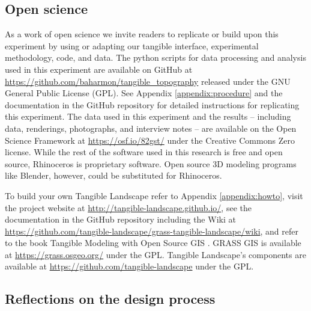 \documentclass[prodmode,acmtochi]{acmsmall} %
\begin{document}
\subsection{Open science} 

% 
%

As a work of open science we invite readers to
replicate or build upon this experiment by 
using or adapting our tangible interface, experimental methodology, code, and data. 
The python scripts for data processing and analysis used in this experiment 
are available on GitHub at 
\url{https://github.com/baharmon/tangible_topography}
released under the GNU General Public License (GPL). 
See Appendix \ref{appendix:procedure}
and the documentation in the GitHub repository 
for detailed instructions for replicating this experiment. 
The data used in this experiment 
and the results -- 
including data, renderings, photographs, and interview notes --
are available on the Open Science Framework 
at \url{https://osf.io/82gst/} under the Creative Commons Zero license.
While the rest of the software used in this research is free and open source, 
Rhinoceros is proprietary software. 
Open source 3D modeling programs like 
Blender, however,
could be substituted for Rhinoceros. 

To build your own Tangible Landscape
refer to Appendix \ref{appendix:howto},
visit the project website at \url{http://tangible-landscape.github.io/}, 
see the documentation in the GitHub repository 
including the Wiki at \url{https://github.com/tangible-landscape/grass-tangible-landscape/wiki},
and refer to the book Tangible Modeling with Open Source GIS \cite{Petrasova2015}.
GRASS GIS is available at
\url{https://grass.osgeo.org/} 
under the GPL. 
Tangible Landscape's components are available at
\url{https://github.com/tangible-landscape}
under the GPL. 

\subsection{Reflections on the design process} %

% 
%
\end{document}
